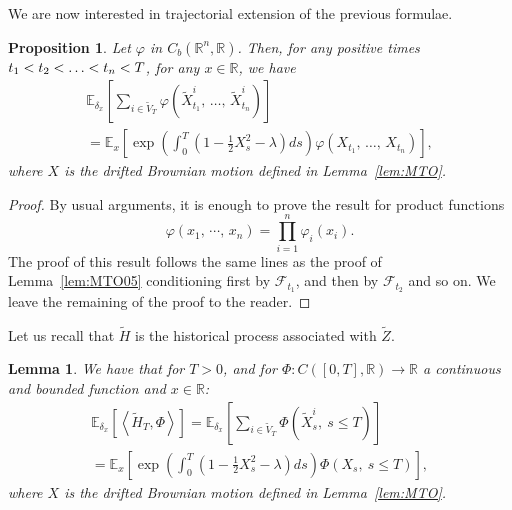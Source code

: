 \documentclass[10pt]{amsart}
\newtheorem{lemm}[theo]{Lemma}\newtheorem{prop}[theo]{Proposition}\newtheorem{coro}[theo]{Corollary}\newtheorem{conj}[theo]{Conjecture}
\theoremstyle{definition}\newtheorem{defi}[theo]{Definition}\newtheorem{rema}[theo]{Remark}\newtheorem{exam}[theo]{Example}\newtheorem{exem}[theo]{Example}\newtheorem{nota}[theo]{Notation}
\newcommand{\Fo}{\mathcal{F}}
\newcommand*\R{\mathbb{R}}
\newcommand*\E{\mathbb{E}}
\begin{document}
We are now interested in trajectorial extension of the previous formulae.


\begin{prop}\label{lem:MTO06}
Let $\varphi$ in $C_{b}(\R^{n},\R)$. Then, for any positive times $t_{1}<t_{2}\linebreak<\ldots<t_{n}<T$, for any $x\in \R$, we have
\begin{multline}\label{eq:MTO06}
\E_{\delta_{x}}\left[\sum_{i \in \widetilde V_{T}} \varphi\left(\widetilde X^{i}_{t_{1}},\,\ldots,\, \widetilde X^{i}_{t_{n}}\right) \right]\\
=\E_{x}\left[\exp\left(\int_{0}^{T} \left(1-\frac{1}{2}X_{s}^{2}-\lambda \right)ds \right)\varphi\left(X_{t_{1}},\,\ldots,\,X_{t_{n}}\right) \right],
\end{multline}
where $X$ is the drifted Brownian motion defined in Lemma~\ref{lem:MTO}.
\end{prop}

\begin{proof}
By usual arguments, it is enough to prove the result for product functions
\[
\varphi\left(x_{1},\,\cdots,\, x_{n}\right)= \prod_{i=1}^n \varphi_{i}\left(x_{i}\right).
\]
The proof of this result follows the same lines as the proof of Lemma~\ref{lem:MTO05} conditioning first by $\Fo_{t_{1}}$, and then by $\Fo_{t_{2}}$ and so on. We leave the remaining of the proof to the reader.
\end{proof}



Let us recall that $\widetilde{H}$ is the historical process associated with $\widetilde{Z}$.
\begin{lemm}
We have that for $T>0$, and for $\Phi:C([0,T],\R)\to\R$ a continuous and bounded function and $x\in \R$:
\begin{multline}\label{eq:MTO099}
\E_{\delta_x}\left[\left\langle \widetilde{H}_T,\Phi\right\rangle\right]=\E_{\delta_{x}}\left[\sum_{i \in  \widetilde{V}_{T}}\Phi\left(\widetilde{X}^i_{s},\ s\leq T\right) \right]\\
=\E_{x}\left[\exp\left(\int_{0}^{T} \left(1-\frac{1}{2}X_{s}^{2}-\lambda \right)ds \right)\Phi\left(X_{s},\ s\leq T\right) \right],
\end{multline}
where $X$ is the drifted Brownian motion defined in Lemma~\ref{lem:MTO}.
\end{lemm}
\end{document}
